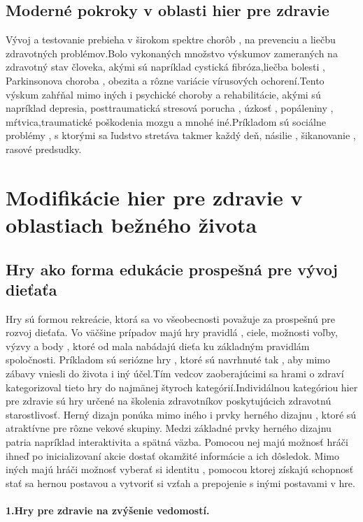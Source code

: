\documentclass[10pt,twoside,slovak,a4paper]{coursepaper}
\begin{document}
\subsection{Moderné pokroky v oblasti hier pre zdravie}
Vývoj a testovanie prebieha v širokom spektre chorôb , na prevenciu a liečbu zdravotných problémov.Bolo vykonaných množstvo výskumov zameraných na zdravotný stav človeka, akými sú napríklad cystická fibróza,liečba bolesti , Parkinsonova choroba , obezita a rôzne variácie vírusových ochorení.Tento výskum zahŕňal mimo iných i psychické  choroby a rehabilitácie, akými sú napríklad depresia, posttraumatická stresová porucha , úzkosť , popáleniny , mŕtvica,traumatické poškodenia mozgu a mnohé iné.Príkladom sú sociálne problémy , s ktorými sa ľudstvo stretáva takmer každý deň, násilie , šikanovanie , rasové predsudky\cite{bworld}.
\label{nejaka}
\section{Modifikácie hier pre zdravie v oblastiach bežného života}

\subsection{Hry ako forma edukácie prospešná pre vývoj dieťaťa}
Hry sú formou rekreácie, ktorá sa vo všeobecnosti považuje za prospešnú pre rozvoj dieťaťa. Vo väčšine prípadov majú hry pravidlá , ciele, možnosti voľby, výzvy a body , ktoré od mala nabádajú dieťa ku základným pravidlám spoločnosti. Príkladom sú seriózne hry , ktoré sú navrhnuté tak , aby mimo zábavy vniesli do života i iný účel.Tím vedcov zaoberajúcimi sa hrami o zdraví kategorizoval tieto hry do najmänej štyroch kategórií.Individálnou kategóriou hier pre zdravie sú hry určené na školenia zdravotníkov poskytujúcich zdravotnú starostlivosť. Herný dizajn ponúka mimo iného i prvky herného dizajnu , ktoré sú atraktívne pre rôzne vekové skupiny. Medzi základné prvky herného dizajnu patria napríklad interaktivita a spätná väzba. Pomocou nej majú možnosť hráči ihneď po inicializovaní akcie dostať okamžité informácie a ich dôsledok. Mimo iných majú hráči možnosť vyberať si identitu , pomocou ktorej získajú schopnosť stať sa hernou postavou a vytvoriť si vzťah a prepojenie s inými postavami v hre.
\paragraph{1.Hry pre zdravie na zvýšenie vedomostí.}
\end{document}
